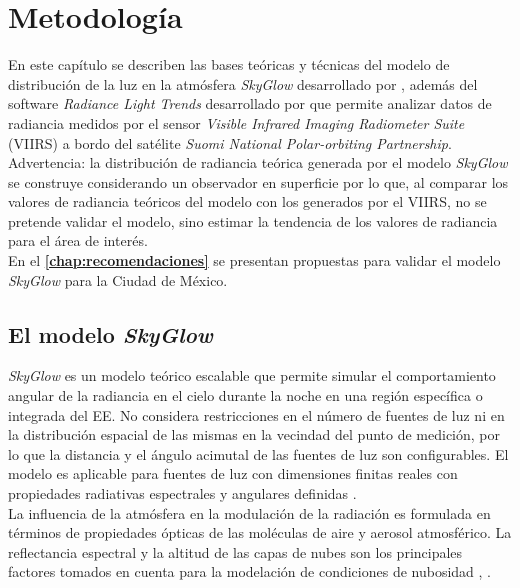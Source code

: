 \chapter{Metodología}
\label{chap:metodologia}

En este capítulo se describen las bases teóricas y técnicas del modelo de distribución de la luz en la atmósfera \textit{SkyGlow} desarrollado por \cite{Kocifaj2007}, además del software \textit{Radiance Light Trends} desarrollado por \cite{RLT2019} que permite analizar datos de radiancia medidos por el sensor \textit{Visible Infrared Imaging Radiometer Suite} (VIIRS) a bordo del satélite \textit{Suomi National Polar-orbiting Partnership}.\\

Advertencia: la distribución de radiancia teórica generada por el modelo \textit{SkyGlow} se construye considerando un observador en superficie por lo que, al comparar los valores de radiancia teóricos del modelo con los generados por el VIIRS, no se pretende validar el modelo, sino estimar la tendencia de los valores de radiancia para el área de interés.\\

En el \textbf{\autoref{chap:recomendaciones}} se presentan propuestas para validar el modelo \textit{SkyGlow} para la Ciudad de México.\\ 

\section{El modelo \textit{SkyGlow}}


\textit{SkyGlow} es un modelo teórico escalable que permite simular el comportamiento angular de la radiancia en el cielo durante la noche en una región específica o integrada del EE. No considera restricciones en el número de fuentes de luz ni en la distribución espacial de las mismas en la vecindad del punto de medición, por lo que la distancia y el ángulo acimutal de las fuentes de luz son configurables. El modelo es aplicable para fuentes de luz con dimensiones finitas reales con propiedades radiativas espectrales y angulares definidas \citep{Kocifaj2007}.\\ 

La influencia de la atmósfera en la modulación de la radiación es formulada en términos de propiedades ópticas de las moléculas de aire y aerosol atmosférico. La reflectancia espectral y la altitud de las capas de nubes son los principales factores tomados en cuenta para la modelación de condiciones de nubosidad \citep{Kocifaj2007}, \citep{Solano2014}.\\ 

